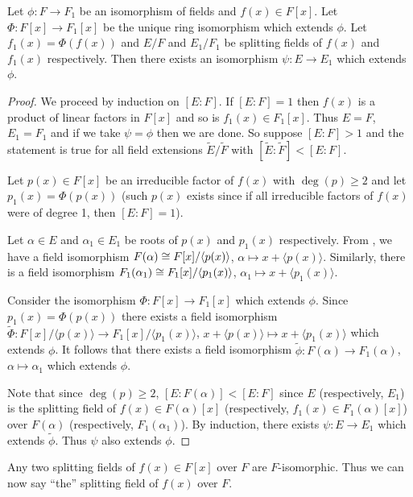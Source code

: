 \documentclass[11pt]{article}
\begin{document}
\begin{theorem}
    Let $\phi:F\to F_1$ be an isomorphism of fields and $f(x)\in F[x]$. Let $\Phi:F[x]\to F_1[x]$ be the unique ring isomorphism which extends $\phi$. Let $f_1(x)=\Phi(f(x))$ and $E/F$ and $E_1/F_1$ be splitting fields of $f(x)$ and $f_1(x)$ respectively. Then there exists an isomorphism $\psi:E\to E_1$ which extends $\phi$.
\end{theorem}

\begin{proof}
    We proceed by induction on $[E:F]$. If $[E:F]=1$ then $f(x)$ is a product of linear factors in $F[x]$ and so is $f_1(x)\in F_1[x]$. Thus $E=F$, $E_1=F_1$ and if we take $\psi=\phi$ then we are done. So suppose $[E:F]>1$ and the statement is true for all field extensions $\tilde{E}/\tilde{F}$ with $[\tilde{E}:\tilde{F}]<[E:F]$.
    
    Let $p(x)\in F[x]$ be an irreducible factor of $f(x)$ with $\deg(p)\geq2$ and let $p_1(x)=\Phi(p(x))$ (such $p(x)$ exists since if all irreducible factors of $f(x)$ were of degree 1, then $[E:F]=1$).
    
    Let $\alpha\in E$ and $\alpha_1\in E_1$ be roots of $p(x)$ and $p_1(x)$ respectively. From , we have a field isomorphism $F(\alpha)\cong F[x]/\langle p(x)\rangle$, $\alpha\mapsto x+\langle p(x)\rangle$. Similarly, there is a field isomorphism $F_1(\alpha_1)\cong F_1[x]/\langle p_1(x)\rangle$, $\alpha_1\mapsto x+\langle p_1(x)\rangle$.
    
    Consider the isomorphism $\Phi:F[x]\to F_1[x]$ which extends $\phi$. Since $p_1(x)=\Phi(p(x))$ there exists a field isomorphism $\tilde{\Phi}:F[x]/\langle p(x)\rangle\to F_1[x]/\langle p_1(x)\rangle$, $x+\langle p(x)\rangle\mapsto x+\langle p_1(x)\rangle$ which extends $\phi$. It follows that there exists a field isomorphism $\tilde{\phi}:F(\alpha)\to F_1(\alpha)$, $\alpha\mapsto\alpha_1$ which extends $\phi$.
    
    Note that since $\deg(p)\geq2$, $[E:F(\alpha)]<[E:F]$ since $E$ (respectively, $E_1$) is the splitting field of $f(x)\in F(\alpha)[x]$ (respectively, $f_1(x)\in F_1(\alpha)[x]$) over $F(\alpha)$ (respectively, $F_1(\alpha_1)$). By induction, there exists $\psi:E\to E_1$ which extends $\tilde{\phi}$. Thus $\psi$ also extends $\phi$.
    
\end{proof}

\begin{corollary}
    Any two splitting fields of $f(x)\in F[x]$ over $F$ are $F$-isomorphic. Thus we can now say ``the'' splitting field of $f(x)$ over $F$.
\end{corollary}
\end{document}
